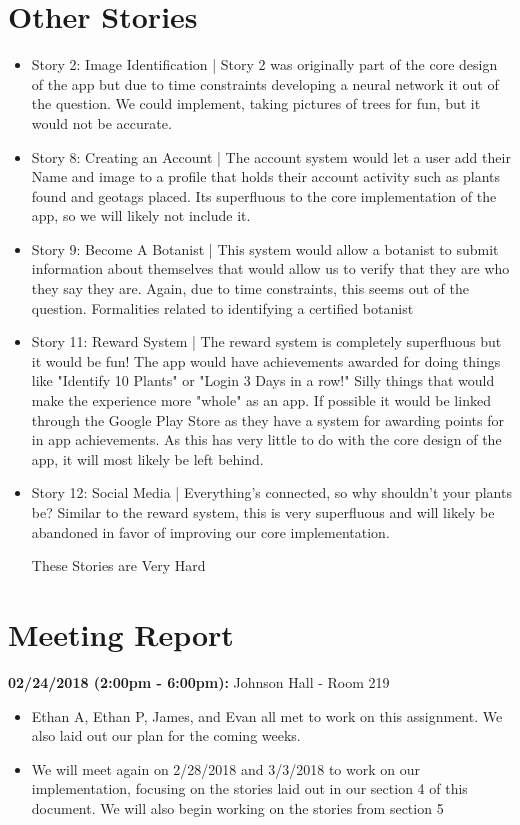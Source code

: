 \documentclass[a4paper]{article}
\begin{document}
\section{Other Stories}
\begin{itemize}
\item Story 2: Image  Identification | Story 2 was originally part of the core design of the app but due to time constraints developing a neural network it out of the question. We could implement, taking pictures of trees for fun, but it would not be accurate. 
\item Story 8: Creating an Account | The account system would let a user add their Name and image to a profile that holds their account activity such as plants found and geotags placed. Its superfluous to the core implementation of the app, so we will likely not include it.
\item Story 9: Become A Botanist | This system would allow a botanist to submit information about themselves that would allow us to verify that they are who they say they are. Again, due to time constraints, this seems out of the question. Formalities related to identifying a certified botanist 
\item Story 11: Reward System |
The reward system is completely superfluous but it would be fun! The app would have achievements awarded for doing things like "Identify 10 Plants" or "Login 3 Days in a row!" Silly things that would make the experience more "whole" as an app. If possible it would be linked through the Google Play Store as they have a system for awarding points for in app achievements. As this has very little to do with the core design of the app, it will most likely be left behind.   
\item Story 12: Social Media | Everything's connected, so why shouldn't your plants be? Similar to the reward system, this is very superfluous and will likely be abandoned in favor of improving our core implementation.

These Stories are Very Hard
\end{itemize}
\section{Meeting Report}
\textbf{02/24/2018 (2:00pm - 6:00pm):} Johnson Hall - Room 219
\begin{itemize}
\item Ethan A, Ethan P, James, and Evan all met to work on this assignment. We also laid out our plan for the coming weeks.
\item We will meet again on 2/28/2018 and 3/3/2018 to work on our implementation, focusing on the stories laid out in our section 4 of this document. We will also begin working on the stories from section 5
\end{itemize}
\end{document}
